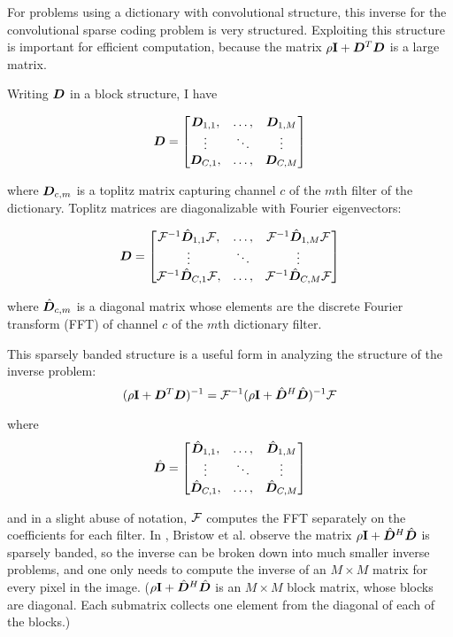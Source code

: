For problems using a dictionary with convolutional structure, this inverse for the convolutional sparse coding problem is very structured. Exploiting this structure is important for efficient computation, because the matrix $\rho{\bf I} + \bm{D}^T\bm{D}$ is a large matrix.

Writing $\bm{D}$ in a block structure, I have

\begin{equation}
\bm{D} = \begin{bmatrix}
\bm{D}_{1,1}, & \hdots, & \bm{D}_{1,M}\\
\vdots & \ddots & \vdots\\
\bm{D}_{C,1}, & \hdots, & \bm{D}_{C,M}
\end{bmatrix}
\end{equation}

where $\bm{D}_{c,m}$ is a toplitz matrix capturing channel $c$ of the $m$th filter of the dictionary. Toplitz matrices are diagonalizable with Fourier eigenvectors:

\begin{equation}
\bm{D} = \begin{bmatrix}
\mathcal{F}^{-1}\hat{\bm{D}}_{1,1}\mathcal{F}, & \hdots, & \mathcal{F}^{-1}\hat{\bm{D}}_{1,M}\mathcal{F}\\
\vdots & \ddots & \vdots\\
\mathcal{F}^{-1}\hat{\bm{D}}_{C,1}\mathcal{F}, & \hdots, & \mathcal{F}^{-1}\hat{\bm{D}}_{C,M}\mathcal{F}
\end{bmatrix}
\end{equation}

where $\hat{\bm{D}}_{c,m}$ is a diagonal matrix whose elements are the discrete Fourier transform (FFT) of channel $c$ of the $m$th dictionary filter.

This sparsely banded structure is a useful form in analyzing the structure of the inverse problem:
\begin{equation}
(\rho {\bf I} + \bm{D}^T\bm{D})^{-1} = \mathcal{F}^{-1}(\rho{\bf I} + \hat{\bm{D}}^H\hat{\bm{D}})^{-1}\mathcal{F}
\end{equation}

where
\begin{equation}
\hat{\bm{D}} = \begin{bmatrix}
\hat{\bm{D}}_{1,1}, & \hdots, & \hat{\bm{D}}_{1,M}\\
\vdots & \ddots & \vdots\\
\hat{\bm{D}}_{C,1}, & \hdots, & \hat{\bm{D}}_{C,M}
\end{bmatrix}
\end{equation}

and in a slight abuse of notation, $\mathcal{F}$ computes the FFT separately on the coefficients for each filter.  In \cite{Bristow2013fast}, Bristow et al. observe the matrix $\rho{\bf I} + \hat{\bm{D}}^H\hat{\bm{D}}$ is sparsely banded, so the inverse can be broken down into much smaller inverse problems, and one only needs to compute the inverse of an $M \times M$ matrix for every pixel in the image. ($\rho{\bf I} + \hat{\bm{D}}^H\hat{\bm{D}}$ is an $M \times M$ block matrix, whose blocks are diagonal.  Each submatrix collects one element from the diagonal of each of the blocks.)

